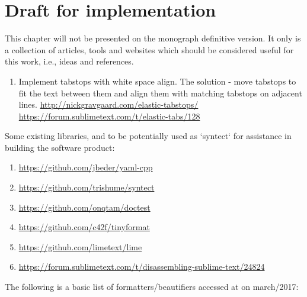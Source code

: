 \chapter{Draft for implementation}

This chapter will not be presented on the monograph definitive version.
It only is a collection of articles,
tools and websites which should be considered useful for this work, i.e., ideas and references.

\medskip
\begin{bluebox}
\begin{enumerate}[leftmargin=*]

    \item Implement tabstops with white space align. The solution - move
    tabstops to fit the text between them and align them with matching tabstops
    on adjacent lines. \url{http://nickgravgaard.com/elastic-tabstops/}
    \url{https://forum.sublimetext.com/t/elastic-tabs/128}

\end{enumerate}
\end{bluebox}

Some existing libraries,
and to be potentially used as `syntect` for assistance in building the software product:

\begin{bluebox}
\begin{enumerate}[leftmargin=*,parsep=0pt]

    \item \url{https://github.com/jbeder/yaml-cpp}
    \item \url{https://github.com/trishume/syntect}
    \item \url{https://github.com/onqtam/doctest}
    \item \url{https://github.com/c42f/tinyformat}
    \item \url{https://github.com/limetext/lime}
    \item \url{https://forum.sublimetext.com/t/disassembling-sublime-text/24824}

\end{enumerate}
\end{bluebox}

The following is a basic list of formatters/beautifiers accessed at
 on march/2017:

